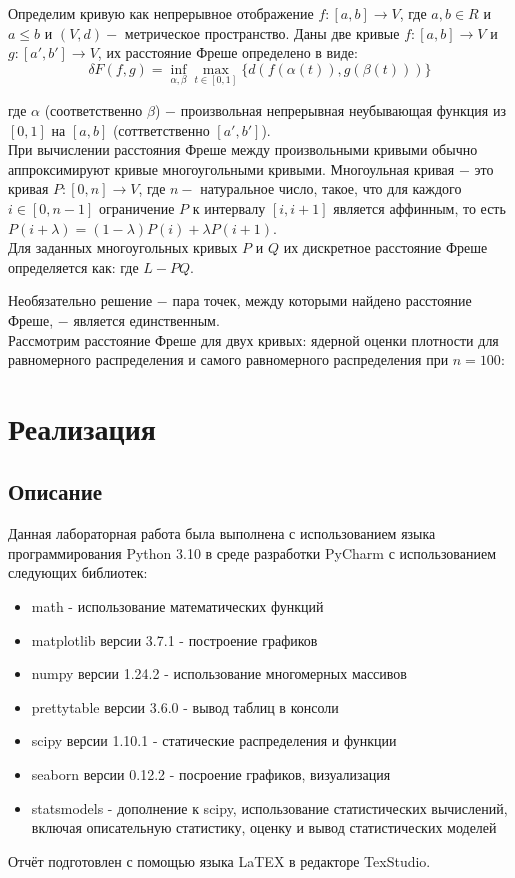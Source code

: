 \documentclass[a4paper,14pt]{article}
\begin{document}
	Определим кривую как непрерывное отображение $f: [a,b] \rightarrow V$, где $a, b \in R$ и $a \leq b$ и $(V,d) - $ метрическое пространство.
	Даны две кривые $f: [a,b] \rightarrow V$ и $g: [a',b'] \rightarrow V$, их расстояние Фреше определено в виде:
	\begin{equation}
		\delta F(f,g) = \inf_{\alpha, \beta}\max_{t \in [0,1]}{\{d(f(\alpha(t)), g(\beta(t)))\}}
	\end{equation}
	
	где $\alpha$ (соответственно $\beta$) $-$ произвольная непрерывная неубывающая функция из $[0, 1]$ на $[a, b]$ (соттветственно $[a',b']$). \\
	При вычислении расстояния Фреше между произвольными кривыми обычно аппроксимируют кривые многоугольными кривыми. Многоульная кривая $-$ это кривая $P: [0,n] \rightarrow V$, где $n - $ натуральное число, такое, что для каждого $i \in [0,n-1]$ ограничение $P$ к интервалу $[i,i+1]$ является аффинным, то есть $P(i+\lambda) = (1-\lambda)P(i)+\lambda P(i+1)$. \\
	Для заданных многоугольных кривых $P$ и $Q$ их дискретное расстояние Фреше определяется как:
	где $L - PQ$.
	
	Необязательно решение $ - $ пара точек, между которыми найдено расстояние Фреше, $-$ является единственным. \\
	
	Рассмотрим расстояние Фреше для двух кривых: ядерной оценки плотности для равномерного распределения и самого равномерного распределения при $n=100$:
		\section{Реализация}
	\subsection{Описание}
	Данная лабораторная работа была выполнена с использованием языка
	программирования Python 3.10 в среде разработки PyCharm с
	использованием следующих библиотек:
	\begin{itemize}
		\item math - использование математических функций
		\item matplotlib версии 3.7.1 - построение графиков
		\item numpy версии 1.24.2 - использование многомерных массивов
		\item prettytable версии 3.6.0 - вывод таблиц в консоли 
		\item scipy версии 1.10.1 - статические распределения и функции
		\item seaborn версии 0.12.2 - посроение графиков, визуализация
		\item statsmodels - дополнение к scipy, использование статистических вычислений, включая описательную статистику, оценку и вывод статистических моделей
	\end{itemize}
	Отчёт подготовлен с помощью языка LaTEX в редакторе TexStudio.
\end{document}
